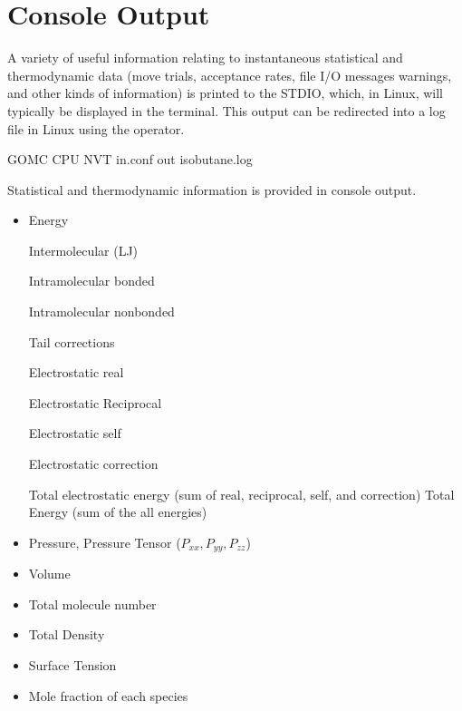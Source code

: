 \documentclass[letterpaper,10pt,english]{sphinxmanual}
\begin{document}
\section{Console Output}
\label{\detokenize{output_file:console-output}}
A variety of useful information relating to instantaneous statistical and thermodynamic data (move trials, acceptance rates, file I/O messages warnings, and other kinds of information) is printed to the STDIO, which, in Linux, will typically be displayed in the terminal. This output can be redirected into a log file in Linux using the \sphinxcode{\sphinxupquote{\textgreater{}}} operator.

%
\begin{sphinxVerbatim}[commandchars=\\\{\}]
\PYGZdl{} GOMC CPU NVT in.conf \PYGZgt{} out isobutane.log 
\end{sphinxVerbatim}

Statistical and thermodynamic information is provided in console output.
\begin{itemize}
\item {} 
Energy

\textendash{} Intermolecular (LJ)

\textendash{} Intramolecular bonded

\textendash{} Intramolecular nonbonded

\textendash{} Tail corrections

\textendash{} Electrostatic real

\textendash{} Electrostatic Reciprocal

\textendash{} Electrostatic self

\textendash{} Electrostatic correction

\textendash{} Total electrostatic energy (sum of real, reciprocal, self, and correction) \textendash{} Total Energy (sum of the all energies)

\item {} 
Pressure, Pressure Tensor (\(P_{xx},P_{yy},P_{zz}\))

\item {} 
Volume

\item {} 
Total molecule number

\item {} 
Total Density

\item {} 
Surface Tension

\item {} 
Mole fraction of each species

\end{itemize}
\end{document}
